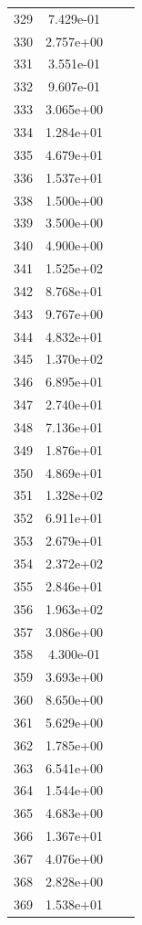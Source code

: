\documentclass[12pt]{article}
\begin{document}
\begin{longtable}{@{}cccc@{}}
329 & 7.429e-01 &  &  \\
330 & 2.757e+00 &  &  \\
331 & 3.551e-01 &  &  \\
332 & 9.607e-01 &  &  \\
333 & 3.065e+00 &  &  \\
334 & 1.284e+01 &  &  \\
335 & 4.679e+01 &  &  \\
336 & 1.537e+01 &  &  \\
338 & 1.500e+00 &  &  \\
339 & 3.500e+00 &  &  \\
340 & 4.900e+00 &  &  \\
341 & 1.525e+02 &  &  \\
342 & 8.768e+01 &  &  \\
343 & 9.767e+00 &  &  \\
344 & 4.832e+01 &  &  \\
345 & 1.370e+02 &  &  \\
346 & 6.895e+01 &  &  \\
347 & 2.740e+01 &  &  \\
348 & 7.136e+01 &  &  \\
349 & 1.876e+01 &  &  \\
350 & 4.869e+01 &  &  \\
351 & 1.328e+02 &  &  \\
352 & 6.911e+01 &  &  \\
353 & 2.679e+01 &  &  \\
354 & 2.372e+02 &  &  \\
355 & 2.846e+01 &  &  \\
356 & 1.963e+02 &  &  \\
357 & 3.086e+00 &  &  \\
358 & 4.300e-01 &  &  \\
359 & 3.693e+00 &  &  \\
360 & 8.650e+00 &  &  \\
361 & 5.629e+00 &  &  \\
362 & 1.785e+00 &  &  \\
363 & 6.541e+00 &  &  \\
364 & 1.544e+00 &  &  \\
365 & 4.683e+00 &  &  \\
366 & 1.367e+01 &  &  \\
367 & 4.076e+00 &  &  \\
368 & 2.828e+00 &  &  \\
369 & 1.538e+01 &  &  \\

\end{longtable}
\end{document}
